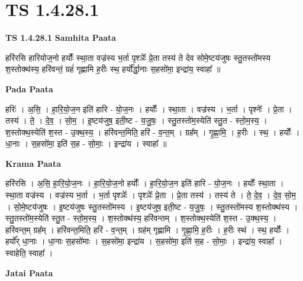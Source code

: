 \documentclass[17pt]{extarticle}
\begin{document}
\section*{ TS 1.4.28.1 }

\textbf{TS 1.4.28.1 } \newline
\textbf{Samhita Paata} \newline

हरि॑रसि हारियोज॒नो हर्योः᳚ स्था॒ता वज्र॑स्य भ॒र्ता पृश्ञेः᳚ प्रे॒ता तस्य॑ ते देव सोमे॒ष्टय॑जुषः स्तु॒तस्तो॑मस्य श॒स्तोक्थ॑स्य॒ हरि॑वन्तं॒ ग्रहं॑ गृह्णामि ह॒रीः स्थ॒ हर्यो᳚र्द्धा॒नाः स॒हसो॑मा॒ इन्द्रा॑य॒ स्वाहा᳚ ॥ \newline

\textbf{Pada Paata} \newline

हरिः॑ । अ॒सि॒ । हा॒रि॒यो॒ज॒न इति॑ हारि - यो॒ज॒नः । हर्योः᳚ । स्था॒ता । वज्र॑स्य । भ॒र्ता । पृश्नेः᳚ । प्रे॒ता । तस्य॑ । ते॒ । दे॒व॒ । सो॒म॒ । इ॒ष्टय॑जुष॒ इती॒ष्ट - य॒जु॒षः॒ । स्तु॒तस्तो॑म॒स्येति॑ स्तु॒त - स्तो॒म॒स्य॒ । श॒स्तोक्थ॒स्येति॑ श॒स्त - उ॒क्थ॒स्य॒ । हरि॑वन्त॒मिति॒ हरि॑ - व॒न्त॒म् । ग्रह᳚म् । गृ॒ह्णा॒मि॒ । ह॒रीः । स्थ॒ । हर्योः᳚ । धा॒नाः । स॒हसो॑मा॒ इति॑ स॒ह - सो॒माः॒ । इन्द्रा॑य । स्वाहा᳚ ॥  \newline


\textbf{Krama Paata} \newline

हरि॑रसि । अ॒सि॒ हा॒रि॒यो॒ज॒नः । हा॒रि॒यो॒ज॒नो हर्योः᳚ । हा॒रि॒यो॒ज॒न इति॑ हारि - यो॒ज॒नः । हर्योः᳚ स्था॒ता । स्था॒ता वज्र॑स्य । वज्र॑स्य भ॒र्ता । भ॒र्ता पृश्ञेः᳚ । पृश्ञेः᳚ प्रे॒ता । प्रे॒ता तस्य॑ । तस्य॑ ते । ते॒ दे॒व॒ । दे॒व॒ सो॒म॒ । सो॒मे॒ष्टय॑जुषः । इ॒ष्टय॑जुषः स्तु॒तस्तो॑मस्य । इ॒ष्टय॑जुष॒ इती॒ष्ट - य॒जु॒षः॒ । स्तु॒तस्तो॑मस्य श॒स्तोक्थ॑स्य । स्तु॒तस्तो॑म॒स्येति॑ स्तु॒त - स्तो॒म॒स्य॒ । श॒स्तोक्थ॑स्य॒ हरि॑वन्तम् । श॒स्तोक्थ॒स्येति॑ श॒स्त - उ॒क्थ॒स्य॒ । हरि॑वन्त॒म् ग्रह᳚म् । हरि॑वन्त॒मिति॒ हरि॑ - व॒न्त॒म् । ग्रह॑म् गृह्णामि । गृ॒ह्णा॒मि॒ ह॒रीः । ह॒रीः स्थ॑ । स्थ॒ हर्योः᳚ । हर्यो᳚र् धा॒नाः । धा॒नाः स॒हसो॑माः । स॒हसो॑मा॒ इन्द्रा॑य । स॒हसो॑मा॒ इति॑ स॒ह - सो॒माः॒ । इन्द्रा॑य॒ स्वाहा᳚ । स्वाहेति॒ स्वाहा᳚ । \newline

\textbf{Jatai Paata} \newline
\end{document}
